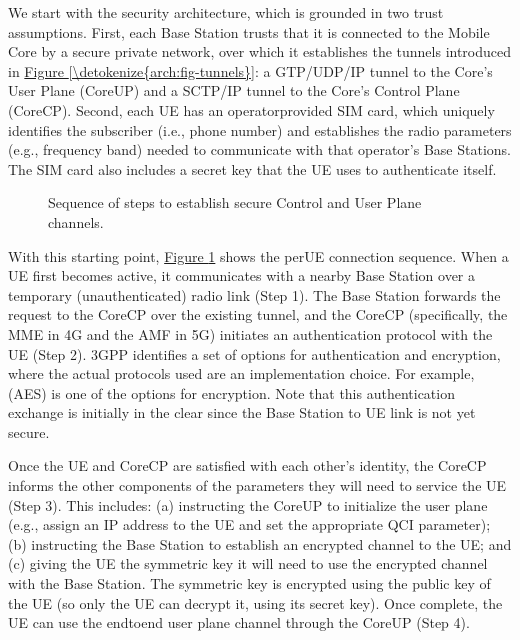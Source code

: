 \documentclass[a4paper,11pt,english]{sphinxmanual}
\let\sphinxpxdimen\pdfpxdimen\else\newdimen\sphinxpxdimen
\begin{document}
\sphinxAtStartPar
We start with the security architecture, which is grounded in two
trust assumptions.  First, each Base Station trusts that it is
connected to the Mobile Core by a secure private network, over which
it establishes the tunnels introduced in \hyperref[\detokenize{arch:fig-tunnels}]{Figure \ref{\detokenize{arch:fig-tunnels}}}: a GTP/UDP/IP tunnel to the Core’s User Plane (Core\sphinxhyphen{}UP)
and a SCTP/IP tunnel to the Core’s Control Plane (Core\sphinxhyphen{}CP). Second,
each UE has an operator\sphinxhyphen{}provided SIM card, which uniquely identifies
the subscriber (i.e., phone number) and establishes the radio
parameters (e.g., frequency band) needed to communicate with that
operator’s Base Stations. The SIM card also includes a secret key that
the UE uses to authenticate itself.

\begin{figure}[ht]
\centering
\capstart

\noindent\sphinxincludegraphics[width=600\sphinxpxdimen]{{Slide34}.png}
\caption{Sequence of steps to establish secure Control and User Plane
channels.}\label{\detokenize{arch:id12}}\label{\detokenize{arch:fig-secure}}\end{figure}

\sphinxAtStartPar
With this starting point, \hyperref[\detokenize{arch:fig-secure}]{Figure \ref{\detokenize{arch:fig-secure}}} shows the
per\sphinxhyphen{}UE connection sequence. When a UE first becomes active, it
communicates with a nearby Base Station over a temporary
(unauthenticated) radio link (Step 1).  The Base Station forwards the
request to the Core\sphinxhyphen{}CP over the existing tunnel, and the Core\sphinxhyphen{}CP
(specifically, the MME in 4G and the AMF in 5G) initiates an
authentication protocol with the UE (Step 2). 3GPP identifies a set of
options for authentication and encryption, where the actual protocols
used are an implementation choice. For example,  (AES) is one of the options for encryption. Note that this
authentication exchange is initially in the clear since the Base
Station to UE link is not yet secure.

\sphinxAtStartPar
Once the UE and Core\sphinxhyphen{}CP are satisfied with each other’s identity, the
Core\sphinxhyphen{}CP informs the other components of the parameters they will need
to service the UE (Step 3). This includes: (a) instructing the Core\sphinxhyphen{}UP
to initialize the user plane (e.g., assign an IP address to the UE and
set the appropriate QCI parameter); (b) instructing the Base Station
to establish an encrypted channel to the UE; and (c) giving the UE the
symmetric key it will need to use the encrypted channel with the Base
Station.  The symmetric key is encrypted using the public key of the
UE (so only the UE can decrypt it, using its secret key). Once
complete, the UE can use the end\sphinxhyphen{}to\sphinxhyphen{}end user plane channel through the
Core\sphinxhyphen{}UP (Step 4).
\end{document}
